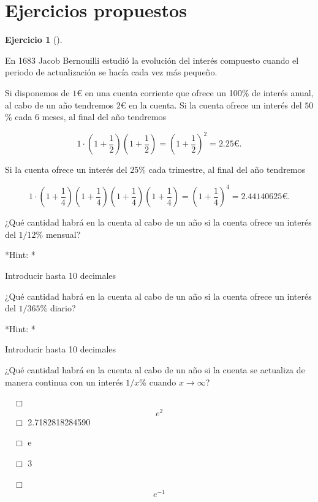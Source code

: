 \documentclass[
  a4paper,
]{scrreport}
\theoremstyle{definition}
\newtheorem{exercise}{Ejercicio}[chapter]
\theoremstyle{remark}
\begin{document}
\section{Ejercicios propuestos}\label{ejercicios-propuestos-2}

\begin{exercise}[]\protect\hypertarget{exr-interes-compuesto}{}\label{exr-interes-compuesto}

En 1683 Jacob Bernouilli estudió la evolución del interés compuesto
cuando el periodo de actualización se hacía cada vez más pequeño.

Si disponemos de \(1\)€ en una cuenta corriente que ofrece un 100\% de
interés anual, al cabo de un año tendremos \(2\)€ en la cuenta. Si la
cuenta ofrece un interés del \(50\)\% cada 6 meses, al final del año
tendremos

\[
1\cdot\left(1+\frac{1}{2}\right)\left(1+\frac{1}{2}\right)= \left(1+\frac{1}{2}\right)^2 = 2.25\mbox{€}.
\]

Si la cuenta ofrece un interés del \(25\)\% cada trimestre, al final del
año tendremos

\[
1\cdot\left(1+\frac{1}{4}\right)\left(1+\frac{1}{4}\right)\left(1+\frac{1}{4}\right)\left(1+\frac{1}{4}\right)= \left(1+\frac{1}{4}\right)^4 = 2.44140625\mbox{€}.
\]

¿Qué cantidad habrá en la cuenta al cabo de un año si la cuenta ofrece
un interés del \(1/12\)\% mensual?

\vspace{18pt}*Hint: *

Introducir hasta 10 decimales

¿Qué cantidad habrá en la cuenta al cabo de un año si la cuenta ofrece
un interés del \(1/365\)\% diario?

\vspace{18pt}*Hint: *

Introducir hasta 10 decimales

¿Qué cantidad habrá en la cuenta al cabo de un año si la cuenta se
actualiza de manera continua con un interés \(1/x\)\% cuando
\(x\to\infty\)?

${\quad\Box}$ $$e^2$$
${\quad\Box}$ 2.7182818284590

${\quad\Box}$ e

${\quad\Box}$ 3

${\quad\Box}$ $$e^{-1}$$

\end{exercise}
\end{document}
